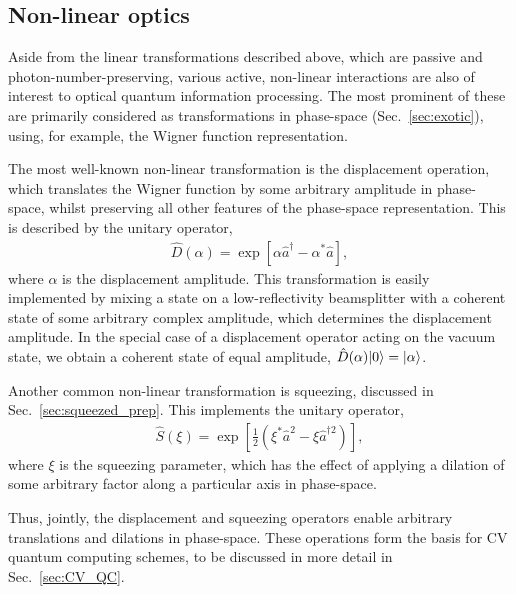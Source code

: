 %
%

\subsection{Non-linear optics} \label{sec:non_lin_opt} 

Aside from the linear transformations described above, which are passive and photon-number-preserving, various active, non-linear interactions are also of interest to optical quantum information processing. The most prominent of these are primarily considered as transformations in phase-space (Sec.~\ref{sec:exotic}), using, for example, the Wigner function representation.

The most well-known non-linear transformation is the displacement operation, which translates the Wigner function by some arbitrary amplitude in phase-space, whilst preserving all other features of the phase-space representation. This is described by the unitary operator,
\begin{align}
\hat{D}(\alpha) = \exp \left[\alpha\hat{a}^\dag - \alpha^*\hat{a}\right],
\end{align}
where $\alpha$ is the displacement amplitude. This transformation is easily implemented by mixing a state on a low-reflectivity beamsplitter with a coherent state of some arbitrary complex amplitude, which determines the displacement amplitude. In the special case of a displacement operator acting on the vacuum state, we obtain a coherent state of equal amplitude, \mbox{$\hat{D}(\alpha)|0\rangle=|\alpha\rangle$}.

Another common non-linear transformation is squeezing, discussed in Sec.~\ref{sec:squeezed_prep}. This implements the unitary operator,
\begin{align}
\hat{S}(\xi) = \exp \left[ \frac{1}{2}(\xi^*\hat{a}^2 - \xi{\hat{a}^{\dag 2}})\right],
\end{align}
where $\xi$ is the squeezing parameter, which has the effect of applying a dilation of some arbitrary factor along a particular axis in phase-space.

Thus, jointly, the displacement and squeezing operators enable arbitrary translations and dilations in phase-space. These operations form the basis for CV quantum computing schemes, to be discussed in more detail in Sec.~\ref{sec:CV_QC}.

%
%

